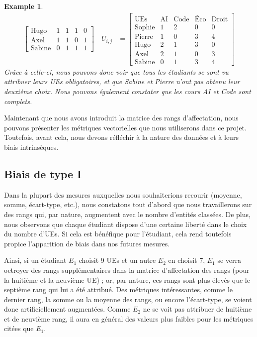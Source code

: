 \documentclass{rapport}
\theoremstyle{definition}
\theoremstyle{remark}
\theoremstyle{plain}
\newtheorem{example}{Example}
\theoremstyle{definition}
\theoremstyle{definition}
\theoremstyle{remark}
\theoremstyle{definition}
\begin{document}
\begin{example}
$$\begin{aligned}
\begin{bmatrix}
            \text{Hugo} & 1 & 1 & 1 & 0\\
            \text{Axel} & 1 & 1 & 0 & 1\\
            \text{Sabine} & 0 & 1 & 1 & 1
        \end{bmatrix}
    \quad
    U_{i,j} &=
        \begin{bmatrix}
            \text{UEs} & \text{AI} & \text{Code} & \text{Éco} & \text{Droit}\\
            \text{Sophie} & 1 & 2 & 0 & 0\\
            \text{Pierre} & 1 & 0 & 3 & 4\\
            \text{Hugo} & 2 & 1 & 3 & 0\\
            \text{Axel} & 2 & 1 & 0 & 3\\
            \text{Sabine} & 0 & 1 & 3 & 4
        \end{bmatrix}
    \end{aligned}
    $$
    Grâce à celle-ci, nous pouvons donc voir que tous les étudiants se sont vu attribuer leurs UEs obligatoires, et que Sabine et Pierre n'ont pas obtenu leur deuxième choix.
    Nous pouvons également constater que les cours AI et Code sont complets.
\end{example}

Maintenant que nous avons introduit la matrice des rangs d'affectation, nous pouvons présenter les métriques vectorielles que nous utiliserons dans ce projet.
Toutefois, avant cela, nous devons réfléchir à la nature des données et à leurs biais intrinsèques.

\subsection{Biais de type I}
Dans la plupart des mesures auxquelles nous souhaiterions recourir (moyenne, somme, écart-type, etc.), nous constatons tout d'abord que nous travaillerons sur des rangs qui, par nature, augmentent avec le nombre d'entités classées.
De plus, nous observons que chaque étudiant dispose d'une certaine liberté dans le choix du nombre d'UEs. Si cela est bénéfique pour l'étudiant, cela rend toutefois propice l'apparition de biais dans nos futures mesures.

Ainsi, si un étudiant $E_1$ choisit 9 UEs et un autre $E_2$ en choisit 7, $E_1$ se verra octroyer des rangs supplémentaires dans la matrice d'affectation des rangs (pour la huitième et la neuvième UE) ; or, par nature, ces rangs sont plus élevés que le septième rang qui lui a été attribué.
Des métriques intéressantes, comme le dernier rang, la somme ou la moyenne des rangs, ou encore l'écart-type, se voient donc artificiellement augmentées. Comme $E_2$ ne se voit pas attribuer de huitième et de neuvième rang, il aura en général des valeurs plus faibles pour les métriques citées que $E_1$.
\end{document}

